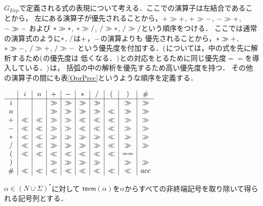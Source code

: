 \documentclass[a4j,dvipdfmx]{jbook}
\begin{document}
$G_{Exp}$で定義される式の表現について考える．ここでの演算子は左結合であることから，
左にある演算子が優先されることから，${\tt +}\gg{\tt +}$, ${\tt +}\gg{\tt -}$,
${\tt -}\gg{\tt +}$, ${\tt -}\gg{\tt -}$ および ${\tt *}\gg{\tt *}$, ${\tt *}\gg{\tt /}$,
${\tt /}\gg{\tt *}$, ${\tt /}\gg{\tt /}$という順序をつける．
ここでは通常の演算式のように${\tt *}$, ${\tt /}$は${\tt +}$，${\tt -}$の演算よりも
優先されることから，${\tt *}\gg{\tt +}$, ${\tt *}\gg{\tt -}$, ${\tt /}\gg{\tt +}$, ${\tt /}\gg{\tt -}$
という優先度を付加する．${\tt (}$については，中の式を先に解析するため${\tt (}$の優先度は
低くなる．${\tt )}$との対応をとるために同じ優先度$==$を導入している．${\tt )}$は，
括弧の中の解析を優先するため高い優先度を持つ．
その他の演算子の間にも表\ref{OprPrec}というような順序を定義する．

\begin{table}
  \begin{center}
    $\begin{array}{c|c|c|c|c|c|c|c|c|c}
              & i   & n   & {\tt +} & {\tt -} & {\tt *} & {\tt /} & {\tt (} & {\tt )} & {\tt \#} \\\hline
        i     &     &     & \gg   & \gg   & \gg   & \gg   &       & \gg   & \gg  \\
        n     &     &     & \gg   & \gg   & \gg   & \gg   & \ll   & \gg   & \gg  \\
        {\tt +} & \ll & \ll & \gg   & \gg   & \ll   & \ll   & \ll   & \gg   & \gg  \\
        {\tt -} & \ll & \ll & \gg   & \gg   & \ll   & \ll   & \ll   & \gg   & \gg  \\
        {\tt *} & \ll & \ll & \gg   & \gg   & \gg   & \gg   & \ll   & \gg   & \gg  \\
        {\tt /} & \ll & \ll & \gg   & \gg   & \gg   & \gg   & \ll   & \gg   & \gg  \\
        {\tt (} & \ll & \ll & \ll   & \ll   & \ll   & \ll   & \ll   & ==    &      \\
        {\tt )} &     &     & \gg   & \gg   & \gg   & \gg   &       & \gg   & \gg  \\
        {\tt \#}  & \ll & \ll & \ll   & \ll   & \ll   & \ll   & \ll   & \ll   & acc
      \end{array}$\end{center}
  \caption{演算子順位表}\label{OprPrec}
\end{table}

\begin{Def}
  $\alpha\in(N\cup\Sigma)^\ast$に対して
  $\mathsf{term}(\alpha)$を$\alpha$からすべての非終端記号を取り除いて得られる記号列とする．
\end{Def}
\end{document}
